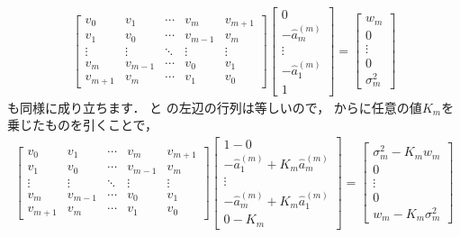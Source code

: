 \begin{align}
\begin{bmatrix}
v_{0}&v_{1}&\cdots&v_{m}&v_{m+1}\\
v_1&v_0&\cdots&v_{m-1}&v_{m}\\
\vdots&\vdots&\ddots&\vdots&\vdots\\
v_{m}&v_{m-1}&\cdots&v_{0}&v_{1}\\
v_{m+1}&v_{m}&\cdots&v_{1}&v_{0}
\end{bmatrix}
\begin{bmatrix}
0\\
-\hat{a}_m^{(m)}\\
\vdots\\
-\hat{a}_1^{(m)}\\
1
\end{bmatrix}
=
\begin{bmatrix}
w_{m}\\
0\\
\vdots\\
0\\
\sigma_m^2
\end{bmatrix}
\label{eq:LevinsonDurbin_5}
\end{align}
も同様に成り立ちます．
と
の左辺の行列は等しいので，
からに任意の値$K_m$を乗じたものを引くことで，
\begin{align}
\begin{bmatrix}
v_{0}&v_{1}&\cdots&v_{m}&v_{m+1}\\
v_1&v_0&\cdots&v_{m-1}&v_{m}\\
\vdots&\vdots&\ddots&\vdots&\vdots\\
v_{m}&v_{m-1}&\cdots&v_{0}&v_{1}\\
v_{m+1}&v_{m}&\cdots&v_{1}&v_{0}
\end{bmatrix}
\begin{bmatrix}
1-0\\
-\hat{a}_1^{(m)}+K_m \hat{a}_m^{(m)}\\
\vdots\\
-\hat{a}_m^{(m)}+K_m \hat{a}_1^{(m)}\\
0-K_m
\end{bmatrix}
=
\begin{bmatrix}
\sigma_m^2-K_m
w_{m}\\
0\\
\vdots\\
0\\
w_{m}-K_m\sigma_m^2
\end{bmatrix}
\label{eq:LevinsonDurbin_6}
\end{align}

